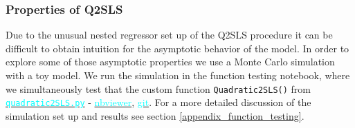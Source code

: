 \documentclass[12pt]{article}
\newcommand{\inlinecode}{\texttt}
\begin{document}
\subsubsection{Properties of Q2SLS}
Due to the unusual nested regressor set up of the Q2SLS procedure it can be difficult to obtain intuition for the asymptotic behavior of the model. In order to explore some of those asymptotic properties we use a Monte Carlo simulation with a toy model. We run the simulation in the function testing notebook, where we simultaneously test that the custom function \inlinecode{Quadratic2SLS()} from \href{https://github.com/nadavtadelis/Reproducible_Metrics/blob/master/quadratic2SLS.py}{\textcolor{cyan}{\inlinecode{quadratic2SLS.py}}} - \href{https://nbviewer.jupyter.org/github/nadavtadelis/Reproducible_Metrics/blob/master/function_testing.ipynb}{\textcolor{cyan}{nbviewer}}, \href{https://github.com/nadavtadelis/Reproducible_Metrics/blob/master/function_testing.ipynb}{\textcolor{cyan}{git}}. For a more detailed discussion of the simulation set up and results see section \ref{appendix_function_testing}.
\end{document}
